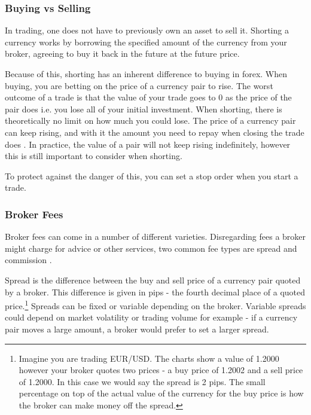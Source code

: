             
            \subsubsection{Buying vs Selling}
            In trading, one does not have to previously own an asset to sell it. Shorting a currency works by borrowing the specified amount of the currency from your broker, agreeing to buy it back in the future at the future price. 
            
            Because of this, shorting has an inherent difference to buying in forex. When buying, you are betting on the price of a currency pair to rise. The worst outcome of a trade is that the value of your trade goes to 0 as the price of the pair does i.e. you lose all of your initial investment. When shorting, there is theoretically no limit on how much you could lose. The price of a currency pair can keep rising, and with it the amount you need to repay when closing the trade does \cite{russell}. In practice, the value of a pair will not keep rising indefinitely, however this is still important to consider when shorting.

            To protect against the danger of this, you can set a stop order when you start a trade.
                

            \subsubsection{Broker Fees}
            
            Broker fees can come in a number of different varieties. Disregarding fees a broker might charge for advice or other services, two common fee types are spread and commission \cite{tradimo_cost}.
            
            Spread is the difference between the buy and sell price of a currency pair quoted by a broker. This difference is given in pips - the fourth decimal place of a quoted price.\footnote{Imagine you are trading EUR/USD. The charts show a value of 1.2000 however your broker quotes two prices - a buy price of 1.2002 and a sell price of 1.2000. In this case we would say the spread is 2 pips. The small percentage on top of the actual value of the currency for the buy price is how the broker can make money off the spread.} Spreads can be fixed or variable depending on the broker. Variable spreads could depend on market volatility or trading volume for example - if a currency pair moves a large amount, a broker would prefer to set a larger spread. 

